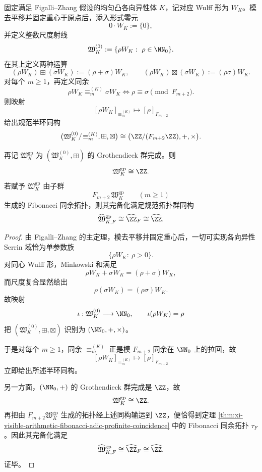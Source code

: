 \begin{theorem}\label{thm:xi-time-part9x-serrin-ray-fibonacci-semirings}
固定满足 Figalli--Zhang 假设的均匀凸各向异性体 \(K\)，记对应 Wulff 形为 \(W_K\)。模去平移并固定重心于原点后，添入形式零元
\[
0\cdot W_K:=\{0\},
\]
并定义整数尺度射线
\[
\mathfrak W_K^{(0)}:=\{\rho W_K:\ \rho\in \NN_0\}.
\]
在其上定义两种运算
\[
(\rho W_K)\boxplus(\sigma W_K):=(\rho+\sigma)W_K,
\qquad
(\rho W_K)\boxtimes(\sigma W_K):=(\rho\sigma)W_K.
\]
对每个 \(m\ge 1\)，再定义同余
\[
\rho W_K\equiv_m^{(K)}\sigma W_K
\iff
\rho\equiv \sigma \pmod{F_{m+2}}.
\]
则映射
\[
[\rho W_K]_{\equiv_m^{(K)}}\longmapsto [\rho]_{F_{m+2}}
\]
给出规范半环同构
\[
\bigl(\mathfrak W_K^{(0)}/\!\equiv_m^{(K)},\boxplus,\boxtimes\bigr)
\cong
\bigl(\ZZ/(F_{m+2}\ZZ),+,\times\bigr).
\]

再记 \(\mathfrak W_K^{\mathrm{gp}}\) 为 \((\mathfrak W_K^{(0)},\boxplus)\) 的 Grothendieck 群完成。则
\[
\mathfrak W_K^{\mathrm{gp}}\cong \ZZ.
\]
若赋予 \(\mathfrak W_K^{\mathrm{gp}}\) 由子群
\[
F_{m+2}\,\mathfrak W_K^{\mathrm{gp}}
\qquad(m\ge 1)
\]
生成的 Fibonacci 同余拓扑，则其完备化满足规范拓扑群同构
\[
\widehat{\mathfrak W}_{K,F}^{\mathrm{gp}}
\cong
\widehat{\ZZ}_F
\cong
\widehat{\ZZ}.
\]
\end{theorem}
\begin{proof}
由 Figalli--Zhang 的主定理，模去平移并固定重心后，一切可实现各向异性 Serrin 域恰为单参数族
\[
\{\rho W_K:\ \rho>0\}.
\]
对同心 Wulff 形，Minkowski 和满足
\[
\rho W_K+\sigma W_K=(\rho+\sigma)W_K,
\]
而尺度复合显然给出
\[
\rho(\sigma W_K)=(\rho\sigma)W_K.
\]
故映射
\[
\iota:\mathfrak W_K^{(0)}\longrightarrow \NN_0,
\qquad
\iota(\rho W_K)=\rho
\]
把 \((\mathfrak W_K^{(0)},\boxplus,\boxtimes)\) 识别为 \((\NN_0,+,\times)\)。

于是对每个 \(m\ge 1\)，同余 \(\equiv_m^{(K)}\) 正是模 \(F_{m+2}\) 同余在 \(\NN_0\) 上的拉回，故
\[
[\rho W_K]_{\equiv_m^{(K)}}\longmapsto [\rho]_{F_{m+2}}
\]
立即给出所述半环同构。

另一方面，\((\NN_0,+)\) 的 Grothendieck 群完成是 \(\ZZ\)，故
\[
\mathfrak W_K^{\mathrm{gp}}\cong \ZZ.
\]
再把由 \(F_{m+2}\mathfrak W_K^{\mathrm{gp}}\) 生成的拓扑经上述同构输运到 \(\ZZ\)，便恰得到定理 \ref{thm:xi-visible-arithmetic-fibonacci-adic-profinite-coincidence} 中的 Fibonacci 同余拓扑 \(\tau_F\)。因此其完备化满足
\[
\widehat{\mathfrak W}_{K,F}^{\mathrm{gp}}
\cong
\widehat{\ZZ}_F
\cong
\widehat{\ZZ}.
\]
证毕。
\end{proof}

